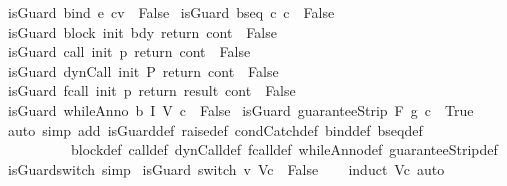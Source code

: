 \begin{isabellebody}
\ {\isachardoublequoteopen}is{\isacharunderscore}Guard\ {\isacharparenleft}bind\ e\ cv{\isacharparenright}\ {\isacharequal}\ False{\isachardoublequoteclose}\isanewline
\ {\isachardoublequoteopen}is{\isacharunderscore}Guard\ {\isacharparenleft}bseq\ c{}\ c{}{\isacharparenright}\ {\isacharequal}\ False{\isachardoublequoteclose}\isanewline
\ {\isachardoublequoteopen}is{\isacharunderscore}Guard\ {\isacharparenleft}block\ init\ bdy\ return\ cont{\isacharparenright}\ {\isacharequal}\ False{\isachardoublequoteclose}\isanewline
\ {\isachardoublequoteopen}is{\isacharunderscore}Guard\ {\isacharparenleft}call\ init\ p\ return\ cont{\isacharparenright}\ {\isacharequal}\ False{\isachardoublequoteclose}\isanewline
\ {\isachardoublequoteopen}is{\isacharunderscore}Guard\ {\isacharparenleft}dynCall\ init\ P\ return\ cont{\isacharparenright}\ {\isacharequal}\ False{\isachardoublequoteclose}\isanewline
\ {\isachardoublequoteopen}is{\isacharunderscore}Guard\ {\isacharparenleft}fcall\ init\ p\ return\ result\ cont{\isacharprime}{\isacharparenright}\ {\isacharequal}\ False{\isachardoublequoteclose}\isanewline
\ {\isachardoublequoteopen}is{\isacharunderscore}Guard\ {\isacharparenleft}whileAnno\ b\ I\ V\ c{\isacharparenright}\ {\isacharequal}\ False{\isachardoublequoteclose}\isanewline
\ {\isachardoublequoteopen}is{\isacharunderscore}Guard\ {\isacharparenleft}guaranteeStrip\ F\ g\ c{\isacharparenright}\ {\isacharequal}\ True{\isachardoublequoteclose}\isanewline
%
\isadelimproof
\ \ %
\endisadelimproof
%
\isatagproof
{}\isamarkupfalse%
\ {\isacharparenleft}auto\ simp\ add{\isacharcolon}\ is{\isacharunderscore}Guard{\isacharunderscore}def\ raise{\isacharunderscore}def\ condCatch{\isacharunderscore}def\ bind{\isacharunderscore}def\ bseq{\isacharunderscore}def\isanewline
\ \ \ \ \ \ \ \ \ \ block{\isacharunderscore}def\ call{\isacharunderscore}def\ dynCall{\isacharunderscore}def\ fcall{\isacharunderscore}def\ whileAnno{\isacharunderscore}def\ guaranteeStrip{\isacharunderscore}def{\isacharparenright}%
\endisatagproof
{\isafoldproof}%
%
\isadelimproof
\isanewline
%
\endisadelimproof
\isanewline
\isanewline
{}\isamarkupfalse%
\ is{\isacharunderscore}Guard{\isacharunderscore}switch\ {\isacharbrackleft}simp{\isacharbrackright}{\isacharcolon}\isanewline
\ {\isachardoublequoteopen}is{\isacharunderscore}Guard\ {\isacharparenleft}switch\ v\ Vc{\isacharparenright}\ {\isacharequal}\ False{\isachardoublequoteclose}\isanewline
%
\isadelimproof
\ \ %
\endisadelimproof
%
\isatagproof
{}\isamarkupfalse%
\ {\isacharparenleft}induct\ Vc{\isacharparenright}\ auto%

\end{isabellebody}
